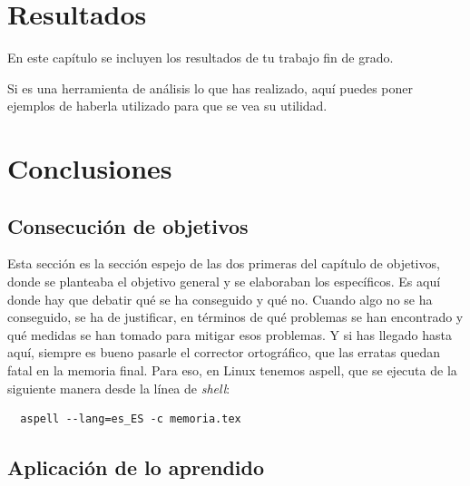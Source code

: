 \documentclass[a4paper, 12pt]{book}
\begin{document}

\cleardoublepage
\chapter{Resultados}
\label{chap:resultados}

En este capítulo se incluyen los resultados de tu trabajo fin de grado.

Si es una herramienta de análisis lo que has realizado, aquí puedes poner ejemplos de haberla utilizado para que se vea su utilidad.



\cleardoublepage
\chapter{Conclusiones}
\label{chap:conclusiones}


\section{Consecución de objetivos}
\label{sec:consecucion-objetivos}

Esta sección es la sección espejo de las dos primeras del capítulo de objetivos, donde se planteaba el objetivo general y se elaboraban los específicos.
Es aquí donde hay que debatir qué se ha conseguido y qué no. 
Cuando algo no se ha conseguido, se ha de justificar, en términos de qué problemas se han encontrado y qué medidas se han tomado para mitigar esos problemas.
Y si has llegado hasta aquí, siempre es bueno pasarle el corrector ortográfico, que las erratas quedan fatal en la memoria final.
Para eso, en Linux tenemos aspell, que se ejecuta de la siguiente manera desde la línea de \emph{shell}:

\begin{verbatim}
  aspell --lang=es_ES -c memoria.tex
\end{verbatim}

\section{Aplicación de lo aprendido}
\label{sec:aplicacion}
\end{document}
